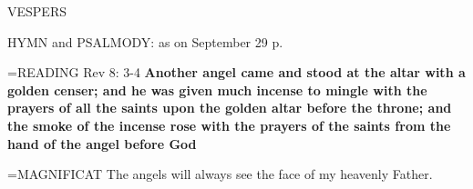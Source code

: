 \begin{flushleft}\normalsize VESPERS\\\end{flushleft}

HYMN and PSALMODY: as on September 29 p. \pageref{archangels:hymn}

\hangindent=\parindent \small{READING} Rev 8: 3-4 \textbf{Another angel came and stood at the altar with a
golden censer; and he was given much incense to mingle with the
prayers of all the saints upon the golden altar before the throne;
and the smoke of the incense rose with the prayers of the saints
from the hand of the angel before God\\}
 
\hangindent=\parindent \small{MAGNIFICAT  The angels will always see the face of my heavenly
Father.\\}
 
